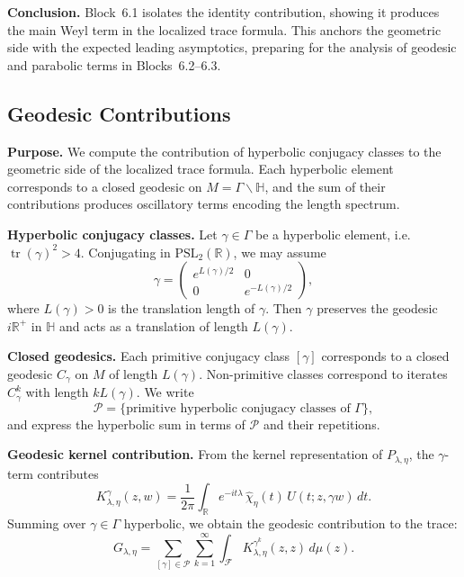 \medskip

\noindent\textbf{Conclusion.}
Block~6.1 isolates the identity contribution,
showing it produces the main Weyl term in the localized trace formula.
This anchors the geometric side with the expected leading asymptotics,
preparing for the analysis of geodesic and parabolic terms in Blocks~6.2–6.3.



\subsection*{Geodesic Contributions}

\noindent\textbf{Purpose.}
We compute the contribution of hyperbolic conjugacy classes to the geometric side of the localized trace formula.
Each hyperbolic element corresponds to a closed geodesic on $M=\Gamma\backslash\mathbb{H}$,
and the sum of their contributions produces oscillatory terms encoding the length spectrum.

\medskip

\noindent\textbf{Hyperbolic conjugacy classes.}
Let $\gamma\in \Gamma$ be a hyperbolic element,
i.e.\ $\operatorname{tr}(\gamma)^2 > 4$.
Conjugating in $\mathrm{PSL}_2(\mathbb{R})$,
we may assume
\[
  \gamma = \begin{pmatrix} e^{L(\gamma)/2} & 0 \\ 0 & e^{-L(\gamma)/2} \end{pmatrix},
\]
where $L(\gamma)>0$ is the translation length of $\gamma$.
Then $\gamma$ preserves the geodesic $i\mathbb{R}^+$ in $\mathbb{H}$
and acts as a translation of length $L(\gamma)$.

\medskip

\noindent\textbf{Closed geodesics.}
Each primitive conjugacy class $[\gamma]$ corresponds to a closed geodesic $C_\gamma$ on $M$ of length $L(\gamma)$.
Non-primitive classes correspond to iterates $C_\gamma^k$ with length $kL(\gamma)$.
We write
\[
  \mathcal{P} = \{ \text{primitive hyperbolic conjugacy classes of } \Gamma \},
\]
and express the hyperbolic sum in terms of $\mathcal{P}$ and their repetitions.

\medskip

\noindent\textbf{Geodesic kernel contribution.}
From the kernel representation of $P_{\lambda,\eta}$,
the $\gamma$-term contributes
\[
  K_{\lambda,\eta}^\gamma(z,w)
  = \frac{1}{2\pi}\int_{\mathbb{R}} e^{-it\lambda}\,\widehat{\chi}_\eta(t)\, U(t;z,\gamma w)\, dt.
\]
Summing over $\gamma\in\Gamma$ hyperbolic,
we obtain the geodesic contribution to the trace:
\[
  G_{\lambda,\eta}
  = \sum_{[\gamma]\in \mathcal{P}} \sum_{k=1}^\infty \int_{\mathcal{F}}
  K_{\lambda,\eta}^{\gamma^k}(z,z)\, d\mu(z).
\]

